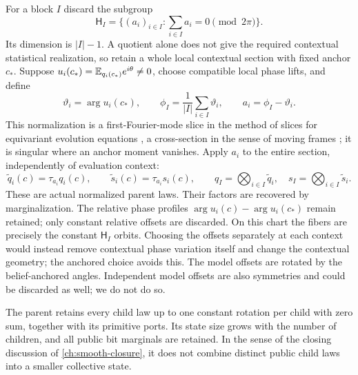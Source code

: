 For a block $I$ discard the subgroup
\begin{equation}
\mathsf H_I=\{(a_i)_{i\in I}:\sum_{i\in I}a_i=0\pmod{2\pi}\}.
\label{open:physical-group}
\end{equation}
Its dimension is $|I|-1$. A quotient alone does not give the required contextual statistical realization, so retain a whole local contextual section with fixed anchor $c_*$. Suppose $u_i(c_*)=\mathbb E_{q_i(c_*)}e^{i\theta}\ne0$, choose compatible local phase lifts, and define
\begin{equation}
\vartheta_i=\arg u_i(c_*),\qquad
\phi_I=\frac1{|I|}\sum_{i\in I}\vartheta_i,\qquad
a_i=\phi_I-\vartheta_i.
\label{open:anchor}
\end{equation}
This normalization is a first-Fourier-mode slice \citep{BudanurEtAl2015} in the method of slices for equivariant evolution equations \citep{RowleyEtAl2003,BeynThummler2004}, a cross-section in the sense of moving frames \citep{FelsOlver1998}; it is singular where an anchor moment vanishes. Apply $a_i$ to the entire section, independently of evaluation context:
\begin{equation}
\widetilde q_i(c)=\tau_{a_i}q_i(c),\qquad
\widetilde s_i(c)=\tau_{a_i}s_i(c),\qquad
q_I=\bigotimes_{i\in I}\widetilde q_i,\quad
s_I=\bigotimes_{i\in I}\widetilde s_i.
\label{open:parent-law}
\end{equation}
These are actual normalized parent laws. Their factors are recovered by marginalization. The relative phase profiles $\arg u_i(c)-\arg u_i(c_*)$ remain retained; only constant relative offsets are discarded. On this chart the fibers are precisely the constant $\mathsf H_I$ orbits. Choosing the offsets separately at each context would instead remove contextual phase variation itself and change the contextual geometry; the anchored choice avoids this. The model offsets are rotated by the belief-anchored angles. Independent model offsets are also symmetries and could be discarded as well; we do not do so.

The parent retains every child law up to one constant rotation per child with zero sum, together with its primitive ports. Its state size grows with the number of children, and all public bit marginals are retained. In the sense of the closing discussion of \cref{ch:smooth-closure}, it does not combine distinct public child laws into a smaller collective state.

